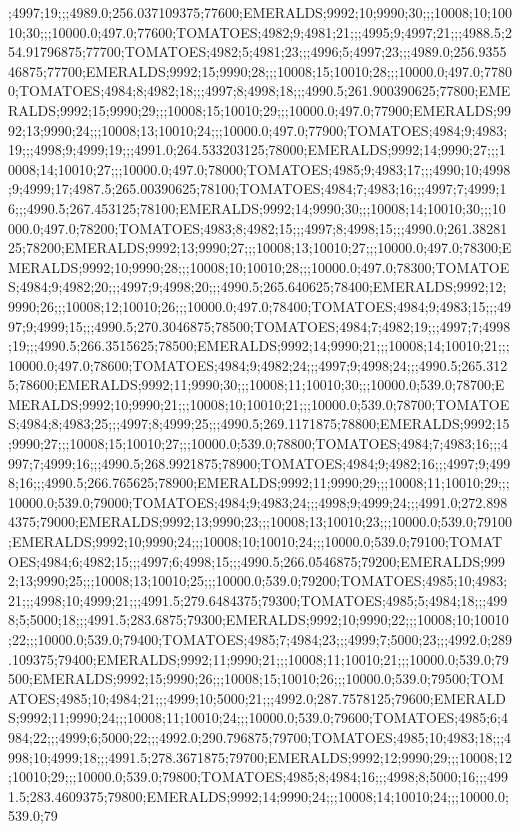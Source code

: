 ;4997;19;;;4989.0;256.037109375;77600;EMERALDS;9992;10;9990;30;;;10008;10;10010;30;;;10000.0;497.0;77600;TOMATOES;4982;9;4981;21;;;4995;9;4997;21;;;4988.5;254.91796875;77700;TOMATOES;4982;5;4981;23;;;4996;5;4997;23;;;4989.0;256.935546875;77700;EMERALDS;9992;15;9990;28;;;10008;15;10010;28;;;10000.0;497.0;77800;TOMATOES;4984;8;4982;18;;;4997;8;4998;18;;;4990.5;261.900390625;77800;EMERALDS;9992;15;9990;29;;;10008;15;10010;29;;;10000.0;497.0;77900;EMERALDS;9992;13;9990;24;;;10008;13;10010;24;;;10000.0;497.0;77900;TOMATOES;4984;9;4983;19;;;4998;9;4999;19;;;4991.0;264.533203125;78000;EMERALDS;9992;14;9990;27;;;10008;14;10010;27;;;10000.0;497.0;78000;TOMATOES;4985;9;4983;17;;;4990;10;4998;9;4999;17;4987.5;265.00390625;78100;TOMATOES;4984;7;4983;16;;;4997;7;4999;16;;;4990.5;267.453125;78100;EMERALDS;9992;14;9990;30;;;10008;14;10010;30;;;10000.0;497.0;78200;TOMATOES;4983;8;4982;15;;;4997;8;4998;15;;;4990.0;261.3828125;78200;EMERALDS;9992;13;9990;27;;;10008;13;10010;27;;;10000.0;497.0;78300;EMERALDS;9992;10;9990;28;;;10008;10;10010;28;;;10000.0;497.0;78300;TOMATOES;4984;9;4982;20;;;4997;9;4998;20;;;4990.5;265.640625;78400;EMERALDS;9992;12;9990;26;;;10008;12;10010;26;;;10000.0;497.0;78400;TOMATOES;4984;9;4983;15;;;4997;9;4999;15;;;4990.5;270.3046875;78500;TOMATOES;4984;7;4982;19;;;4997;7;4998;19;;;4990.5;266.3515625;78500;EMERALDS;9992;14;9990;21;;;10008;14;10010;21;;;10000.0;497.0;78600;TOMATOES;4984;9;4982;24;;;4997;9;4998;24;;;4990.5;265.3125;78600;EMERALDS;9992;11;9990;30;;;10008;11;10010;30;;;10000.0;539.0;78700;EMERALDS;9992;10;9990;21;;;10008;10;10010;21;;;10000.0;539.0;78700;TOMATOES;4984;8;4983;25;;;4997;8;4999;25;;;4990.5;269.1171875;78800;EMERALDS;9992;15;9990;27;;;10008;15;10010;27;;;10000.0;539.0;78800;TOMATOES;4984;7;4983;16;;;4997;7;4999;16;;;4990.5;268.9921875;78900;TOMATOES;4984;9;4982;16;;;4997;9;4998;16;;;4990.5;266.765625;78900;EMERALDS;9992;11;9990;29;;;10008;11;10010;29;;;10000.0;539.0;79000;TOMATOES;4984;9;4983;24;;;4998;9;4999;24;;;4991.0;272.8984375;79000;EMERALDS;9992;13;9990;23;;;10008;13;10010;23;;;10000.0;539.0;79100;EMERALDS;9992;10;9990;24;;;10008;10;10010;24;;;10000.0;539.0;79100;TOMATOES;4984;6;4982;15;;;4997;6;4998;15;;;4990.5;266.0546875;79200;EMERALDS;9992;13;9990;25;;;10008;13;10010;25;;;10000.0;539.0;79200;TOMATOES;4985;10;4983;21;;;4998;10;4999;21;;;4991.5;279.6484375;79300;TOMATOES;4985;5;4984;18;;;4998;5;5000;18;;;4991.5;283.6875;79300;EMERALDS;9992;10;9990;22;;;10008;10;10010;22;;;10000.0;539.0;79400;TOMATOES;4985;7;4984;23;;;4999;7;5000;23;;;4992.0;289.109375;79400;EMERALDS;9992;11;9990;21;;;10008;11;10010;21;;;10000.0;539.0;79500;EMERALDS;9992;15;9990;26;;;10008;15;10010;26;;;10000.0;539.0;79500;TOMATOES;4985;10;4984;21;;;4999;10;5000;21;;;4992.0;287.7578125;79600;EMERALDS;9992;11;9990;24;;;10008;11;10010;24;;;10000.0;539.0;79600;TOMATOES;4985;6;4984;22;;;4999;6;5000;22;;;4992.0;290.796875;79700;TOMATOES;4985;10;4983;18;;;4998;10;4999;18;;;4991.5;278.3671875;79700;EMERALDS;9992;12;9990;29;;;10008;12;10010;29;;;10000.0;539.0;79800;TOMATOES;4985;8;4984;16;;;4998;8;5000;16;;;4991.5;283.4609375;79800;EMERALDS;9992;14;9990;24;;;10008;14;10010;24;;;10000.0;539.0;79
